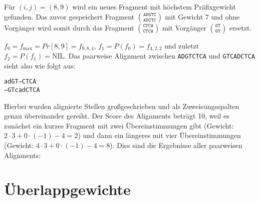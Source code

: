 Für $(i,j) = (8,9)$ wird ein neues Fragment mit höchstem Präfixgewicht gefunden. Das zuvor gespeichert Fragment ${\texttt{ADGTC}}\choose{\texttt{ADCTC}}$ mit Gewicht 7 und ohne Vorgänger wird somit durch das Fragment ${\texttt{CTCA}}\choose{\texttt{CTCA}}$ mit Vorgänger ${\texttt{GT}}\choose{\texttt{GT}}$ ersetzt.


$f_0 = f_{\max} = Pr[8,9] = f_{9,8,4}$, $f_1 = P(f_0) = f_{4,2,2}$ und zuletzt $f_2 = P(f_1) = \text{NIL}$.
Das paarweise Alignment zwischen \texttt{ADGTCTCA} und \texttt{GTCADCTCA} sieht also wie folgt aus: \\
\vspace{-10pt}
\begin{center}
	\texttt{adGT---CTCA} \\
	\texttt{--GTcadCTCA} 
\end{center}
Hierbei wurden alignierte Stellen großgeschrieben und als Zuweisungsspalten genau übereinander gereiht. Der Score des Alignments beträgt 10, weil es zunächst ein kurzes Fragment mit zwei Übereinstimmungen gibt (Gewicht: $2\cdot 3+0\cdot(-1)-4 = 2$) und dann ein längeres mit vier Übereinstimmungen (Gewicht: $4\cdot3+0\cdot(-1)-4 = 8$). Dies sind die Ergebnisse aller paarweisen Alignments:
\vspace{8pt}


\section{Überlappgewichte}\label{sec:ueberlapp}

